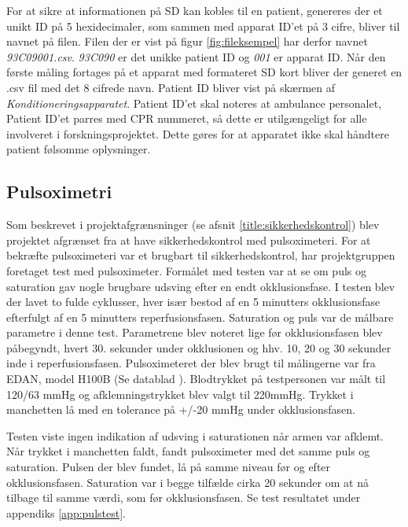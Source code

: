 For at sikre at informationen på SD kan kobles til en patient, genereres der et unikt ID på 5 hexidecimaler, som sammen med apparat ID'et på 3 cifre, bliver til navnet på filen. Filen der er vist på figur \ref{fig:fileksempel} har derfor navnet \textit{93C09001.csv}. \textit{93C090} er det unikke patient ID og \textit{001} er apparat ID. Når den første måling fortages på et apparat med formateret SD kort bliver der generet en .csv fil med det 8 cifrede navn. Patient ID bliver vist på skærmen af \textit{Konditioneringsapparatet}. Patient ID'et skal noteres at ambulance personalet, Patient ID'et parres med CPR nummeret, så dette er utilgængeligt for alle involveret i forskningsprojektet. Dette gøres for at apparatet ikke skal håndtere patient følsomme oplysninger.

\subsection{Pulsoximetri} \label{title:pulsOxi}
Som beskrevet i projektafgrænsninger (se afsnit \ref{title:sikkerhedskontrol}) blev projektet afgrænset fra at have sikkerhedskontrol med pulsoximeteri. For at bekræfte pulsoximeteri var et brugbart til sikkerhedskontrol, har projektgruppen foretaget test med pulsoximeter. Formålet med testen var at se om puls og saturation gav nogle brugbare udsving efter en endt okklusionsfase. I testen blev der lavet to fulde cyklusser, hver især bestod af en 5 minutters okklusionsfase efterfulgt af en 5 minutters reperfusionsfasen. Saturation og puls var de målbare parametre i denne test. Parametrene blev noteret lige før okklusionsfasen blev påbegyndt, hvert 30. sekunder under okklusionen og hhv. 10, 20 og 30 sekunder inde i reperfusionsfasen. Pulsoximeteret der blev brugt til målingerne var fra EDAN, model H100B (Se datablad \cite{RefWorks:30}). Blodtrykket på testpersonen var målt til 120/63 mmHg og afklemningstrykket blev valgt til 220mmHg. Trykket i manchetten lå med en tolerance på +/-20 mmHg under okklusionsfasen. 

Testen viste ingen indikation af udsving i saturationen når armen var afklemt. Når trykket i manchetten faldt, fandt pulsoximeter med det samme puls og saturation. Pulsen der blev fundet, lå på samme niveau før og efter okklusionsfasen. Saturation var i begge tilfælde cirka 20 sekunder om at nå tilbage til samme værdi, som før okklusionsfasen. Se test resultatet under appendiks \ref{app:pulstest}.


